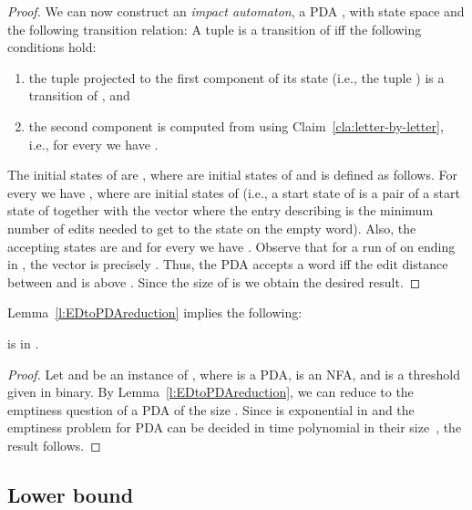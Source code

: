 \documentclass{CSML}
\begin{document}
\begin{proof}
We can now construct an {\em impact automaton}, a PDA ,
with state space  and the
following transition relation:
A tuple  is a transition of  iff the following conditions hold:
\begin{enumerate}
\item the tuple projected to the first component of its state (i.e., the tuple ) is a transition of , and 
\item the second component  is computed from  using Claim~\ref{cla:letter-by-letter}, i.e.,
for every  we have .
\end{enumerate}
The initial states of  are , where 
 are initial states of  and  is defined as follows.
For every  we have , where  are initial states of 
(i.e.,  a start state of  is a pair of a start state of  together with the vector where the entry describing  is the minimum number of edits needed to get to the state  on the empty word). 
Also, the accepting states are  and for every  we have . 
Observe that for a run of  on  ending in , the vector  is precisely .
Thus, the PDA  accepts a word  iff the edit distance between 
 and  is above . 
Since the size of  is  we obtain 
the desired  result.
\end{proof}


Lemma~\ref{l:EDtoPDAreduction} implies the following:

\begin{lem}\label{l:TEDinexp}
 is in .
\end{lem}
\begin{proof}
Let  and  be an instance of , where
 is a PDA,  is an NFA, and  is a threshold given in binary.
By Lemma~\ref{l:EDtoPDAreduction}, we can reduce  to the emptiness question of 
a PDA of the size .
Since  is exponential in  and
the emptiness problem for PDA can be decided in time polynomial in their size~\cite{HU79},
the result follows.
\end{proof}


\subsection{Lower bound}
\label{sec:lowerBoundTED}
\end{document}
